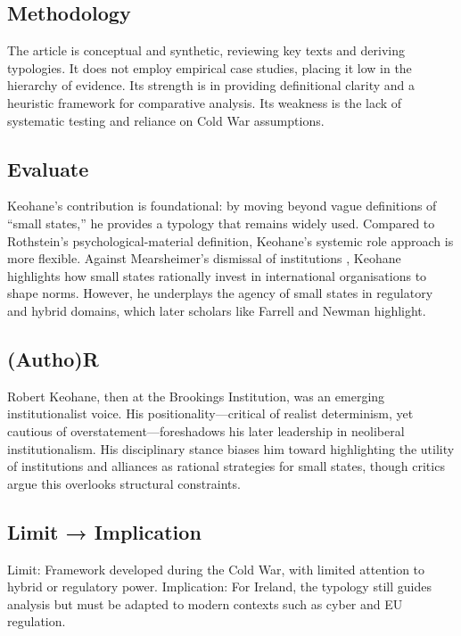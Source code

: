 \subsection*{Methodology}
The article is conceptual and synthetic, reviewing key texts and deriving typologies. It does not employ empirical case studies, placing it low in the hierarchy of evidence. Its strength is in providing definitional clarity and a heuristic framework for comparative analysis. Its weakness is the lack of systematic testing and reliance on Cold War assumptions.

\subsection*{Evaluate}
Keohane’s contribution is foundational: by moving beyond vague definitions of “small states,” he provides a typology that remains widely used. Compared to Rothstein’s psychological-material definition, Keohane’s systemic role approach is more flexible. Against Mearsheimer’s dismissal of institutions \parencite{MEARSHEIMER_1994}, Keohane highlights how small states rationally invest in international organisations to shape norms. However, he underplays the agency of small states in regulatory and hybrid domains, which later scholars like Farrell and Newman \parencite{FARRELL_2019} highlight.

\subsection*{(Autho)R}
Robert Keohane, then at the Brookings Institution, was an emerging institutionalist voice. His positionality—critical of realist determinism, yet cautious of overstatement—foreshadows his later leadership in neoliberal institutionalism. His disciplinary stance biases him toward highlighting the utility of institutions and alliances as rational strategies for small states, though critics argue this overlooks structural constraints.

\subsection*{Limit → Implication}
Limit: Framework developed during the Cold War, with limited attention to hybrid or regulatory power.  
Implication: For Ireland, the typology still guides analysis but must be adapted to modern contexts such as cyber and EU regulation.


